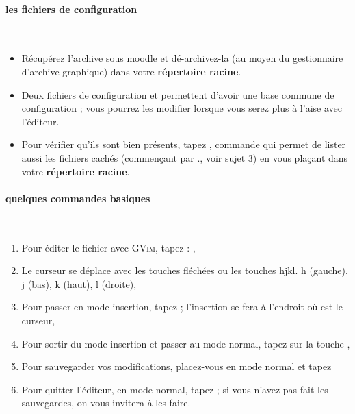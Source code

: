 \documentclass[a4paper,10pt]{article}
\begin{document}
\paragraph{les fichiers de configuration}

\

\begin{maw}
\begin{itemize}
  \item Récupérez l'archive  sous moodle et dé-archivez-la
        (au moyen du gestionnaire d'archive graphique) dans votre
        \textbf{répertoire racine}.
  \item Deux fichiers de configuration  et  
        permettent d'avoir une base commune de configuration ; vous pourrez
        les modifier lorsque vous serez plus à l'aise avec l'éditeur.
  \item Pour vérifier qu'ils sont bien présents, tapez , commande
        qui permet de lister aussi les fichiers cachés (commençant par ., voir
        sujet 3) en vous plaçant dans votre \textbf{répertoire racine}.
\end{itemize}
\end{maw}

\paragraph{quelques commandes basiques}

\

\begin{maw}
\begin{enumerate}
  \item Pour éditer le fichier  avec \textsc{GVim}, tapez :
        ,
  \item Le curseur se d\'eplace avec les touches fl\'ech\'ees ou les touches
        hjkl.  h (gauche), j (bas), k (haut), l (droite),
  \item Pour passer en mode insertion, tapez  ; l'insertion se fera à
        l'endroit où est le curseur,
  \item Pour sortir du mode insertion et passer au mode normal, tapez sur la
        touche ,
  \item Pour sauvegarder vos modifications, placez-vous en mode normal et
        tapez 
  \item Pour quitter  l'éditeur, en mode normal, tapez  ; si
        vous n'avez pas fait les sauvegardes, on vous invitera à les faire.
\end{enumerate}
\end{maw}
\end{document}
